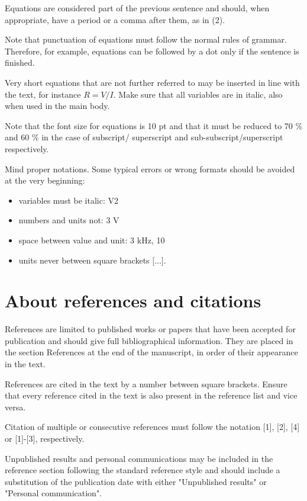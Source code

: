 \documentclass[10pt]{imeko_acta}
\begin{document}
Equations are considered part of the previous sentence and should, when appropriate, have a period or a comma after them, as in (2).

Note that punctuation of equations must follow the normal rules of grammar. Therefore, for example, equations can be followed by a dot only if the sentence is finished.

Very short equations that are not further referred to may be inserted in line with the text, for instance $R = V/I$. Make sure that all variables are in italic, also when used in the main body. 

Note that the font size for equations is 10 pt and that it must be reduced to 70 \% and 60 \% in the case of subscript/ superscript and sub-subscript/superscript respectively.

Mind proper notations. Some typical errors or wrong formats 
should be avoided at the very beginning: 
\begin{itemize}
	\item variables must be italic: V2
	\item numbers and units not: 3 V
	\item space between value and unit: 3 kHz, 10 %
	\item units never between square brackets [...].
\end{itemize}


\section{About references and citations}

References are limited to published works or papers that have been accepted for publication and should give full bibliographical information. They are placed in the section References at the end of the manuscript, in order of their appearance in the text.

References are cited in the text by a number between square brackets. Ensure that every reference cited in the text is also present in the reference list and vice versa.

Citation of multiple or consecutive references must follow the notation [1], [2], [4] or [1]-[3], respectively.

Unpublished results and personal communications may be included in the reference section following the standard reference style and should include a substitution of the publication date with either "Unpublished results" or "Personal communication". 
\end{document}
